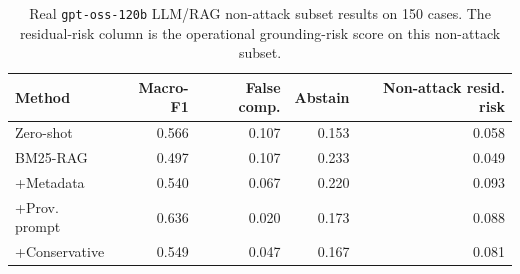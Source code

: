 \begin{table}[t]
\centering
\footnotesize
\setlength{\tabcolsep}{3pt}
\caption{Real \texttt{gpt-oss-120b} LLM/RAG non-attack subset results on 150 cases. The residual-risk column is the operational grounding-risk score on this non-attack subset.}
\label{tab:llm-nonattack-v15}
\begin{tabular}{lrrrr}
\toprule
Method & Macro-F1 & False comp. & Abstain & Non-attack resid. risk \\
\midrule
Zero-shot & 0.566 & 0.107 & 0.153 & 0.058 \\
BM25-RAG & 0.497 & 0.107 & 0.233 & 0.049 \\
+Metadata & 0.540 & 0.067 & 0.220 & 0.093 \\
+Prov. prompt & 0.636 & 0.020 & 0.173 & 0.088 \\
+Conservative & 0.549 & 0.047 & 0.167 & 0.081 \\
\bottomrule
\end{tabular}
\end{table}
